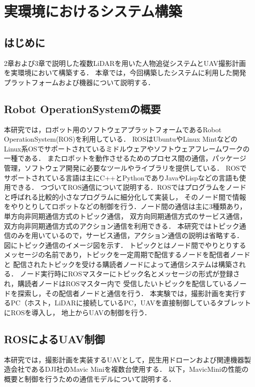 \documentclass[autodetect-engine,dvipdfmx-if-dvi,ja=standard,a4j,jbase=11pt,magstyle=nomag*]{bxjsreport}
\begin{document}
\chapter[実環境におけるシステム構築]{実環境におけるシステム構築}

\section{はじめに}
2章および3章で説明した複数LiDARを用いた人物追従システムとUAV撮影計画を実環境において構築する．
本章では，今回構築したシステムに利用した開発プラットフォームおよび機器について説明する．


\section{Robot OperationSystemの概要}
本研究では，ロボット用のソフトウェアプラットフォームであるRobot OperationSystem(ROS)を利用している．
ROSはUbuntuやLinux MintなどのLinux系OSでサポートされているミドルウェアやソフトウェアフレームワークの一種である．
またロボットを動作させるためのプロセス間の通信，パッケージ管理，ソフトウェア開発に必要なツールやライブラリを提供している．
ROSでサポートされている言語は主にC++とPythonでありJavaやLispなどの言語も使用できる．
つづいてROS通信について説明する．ROSではプログラムをノードと呼ばれる比較的小さなプログラムに細分化して実装し，
そのノード間で情報をやりとりしてロボットなどの制御を行う．ノード間の通信は主に3種類あり，単方向非同期通信方式のトピック通信，
双方向同期通信方式のサービス通信，双方向非同期通信方式のアクション通信を利用できる．
本研究ではトピック通信のみを用いているので，サービス通信，アクション通信の説明は省略する．
図にトピック通信のイメージ図を示す．
トピックとはノード間でやりとりするメッセージの名前であり，トピックを一定周期で配信するノードを配信者ノードと
配信されたトピックを受ける購読者ノードによって通信システムは構築される．
ノード実行時にROSマスターにトピック名とメッセージの形式が登録され，購読者ノードはROSマスター内で
受信したいトピックを配信しているノードを探索し，その配信者ノードと通信を行う．
本実験では，撮影計画を実行するPC（ホスト，LiDARに接続しているPC，UAVを直接制御しているタブレットにROSを導入し，
地上からUAVの制御を行う．


\section{ROSによるUAV制御}
本研究では，撮影計画を実装するUAVとして，民生用ドローンおよび関連機器製造会社であるDJI社のMavic Miniを複数台使用する．
以下，MavicMiniの性能の概要と制御を行うための通信モデルについて説明する．
\end{document}
